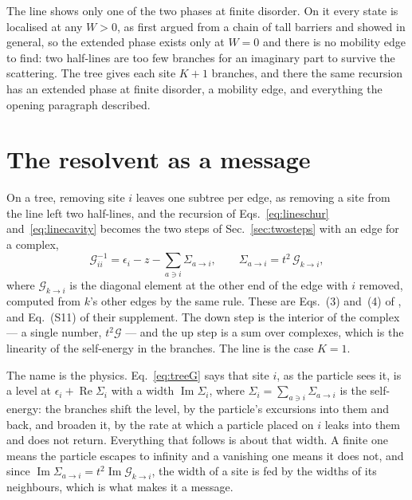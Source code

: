 The line shows only one of the two phases at finite disorder. On it every
state is localised at any $W>0$, as \citet{mott1961} first argued from a
chain of tall barriers and \citet{ishii1973} showed in general, so the
extended phase exists only at $W=0$ and there is no mobility edge to
find: two half-lines
are too few branches for an imaginary part to survive the scattering. The
tree gives each site $K+1$ branches, and there the same recursion has an
extended phase at finite disorder, a mobility edge, and everything the
opening paragraph described.

\section{The resolvent as a message}
\label{sec:resolvent}

On a tree, removing site $i$ leaves one subtree per edge, as removing a
site from the line left two half-lines, and the recursion of
Eqs.~\eqref{eq:lineschur} and~\eqref{eq:linecavity} becomes the two steps
of Sec.~\ref{sec:twosteps} with an edge for a complex,
\begin{equation}
  \mathcal{G}_{ii}^{-1}=\epsilon_{i}-z-\sum_{a\ni i}\Sigma_{a\to i},
  \qquad
  \Sigma_{a\to i}=t^{2}\,\mathcal{G}_{k\to i},
  \label{eq:treeG}
\end{equation}
where $\mathcal{G}_{k\to i}$ is the diagonal element at the other end of the
edge with $i$ removed, computed from $k$'s other edges by the same rule.
These are Eqs.~(3) and~(4) of \citet{tonetti2026}, and Eq.~(S11) of their
supplement. The down step is the interior of the complex --- a single
number, $t^{2}\mathcal{G}$ --- and the up step is a sum over complexes,
which is the linearity of the self-energy in the branches. The line is
the case $K=1$.

The name is the physics. Eq.~\eqref{eq:treeG} says that site $i$, as the
particle sees it, is a level at $\epsilon_{i}+\operatorname{Re}\Sigma_{i}$
with a width $\operatorname{Im}\Sigma_{i}$, where
$\Sigma_{i}=\sum_{a\ni i}\Sigma_{a\to i}$ is the self-energy: the branches
shift the level, by the particle's excursions into them and back, and
broaden it, by the rate at which a particle placed on $i$ leaks into them
and does not return. Everything that follows is about that width. A
finite one means the particle escapes to infinity and a vanishing one
means it does not, and since
$\operatorname{Im}\Sigma_{a\to i}=t^{2}\operatorname{Im}\mathcal{G}_{k\to i}$,
the width of a site is fed by the widths of its neighbours, which is what
makes it a message.


